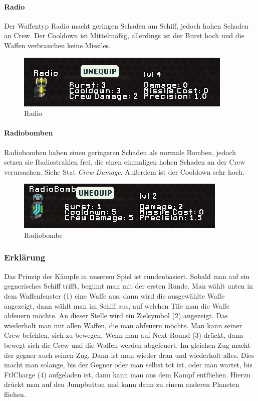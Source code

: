 \documentclass[fontsize=12pt,paper=a4,twoside]{scrartcl}
\begin{document}
\paragraph{Radio}

Der Waffentyp Radio macht geringen Schaden am Schiff, jedoch hohen Schaden an Crew. Der Cooldown ist Mittelmäßig, allerdings ist der Burst hoch und die Waffen verbrauchen keine Missiles. 

\begin{figure}[H]
\centering
\includegraphics[width=1\linewidth]{DasSpiel/Kampf/waffen/radio.png}
\caption{Radio}
\end{figure}

\paragraph{Radiobomben}

Radiobomben haben einen geringeren Schaden als normale Bomben, jedoch setzen sie Radiostrahlen frei, die einen einmaligen hohen Schaden an der Crew verursachen. Siehe Stat \textit{Crew Damage}. Außerdem ist der Cooldown sehr hoch. 

\begin{figure}[H]
\centering
\includegraphics[width=1\linewidth]{DasSpiel/Kampf/waffen/radiobo.png}
\caption{Radiobombe}
\end{figure}

\subsubsection{Erklärung}

Das Prinzip der Kämpfe in unserem Spiel ist rundenbasiert. Sobald man auf ein gegnerisches Schiff trifft, beginnt man mit der ersten Runde. Man wählt unten in dem Waffenfenster (1) eine Waffe aus, dann wird die ausgewählte Waffe angezeigt, dann wählt man im Schiff aus, auf welchen Tile man die Waffe abfeuern möchte. An dieser Stelle wird ein Zielsymbol (2) angezeigt. Das wiederholt man mit allen Waffen, die man abfeuern möchte. Man kann seiner Crew befehlen, sich zu bewegen. Wenn man auf Next Round (3) drückt, dann bewegt sich die Crew und die Waffen werden abgefeuert. Im gleichen Zug macht der gegner auch seinen Zug. Dann ist man wieder dran und wiederholt alles. Dies macht man solange, bis der Gegner oder man selbst tot ist, oder man wartet, bis FtlCharge (4) aufgeladen ist, dann kann man aus dem Kampf entfliehen. Hierzu drückt man auf den Jumpbutton und kann dann zu einem anderen Planeten fliehen. 
\end{document}
